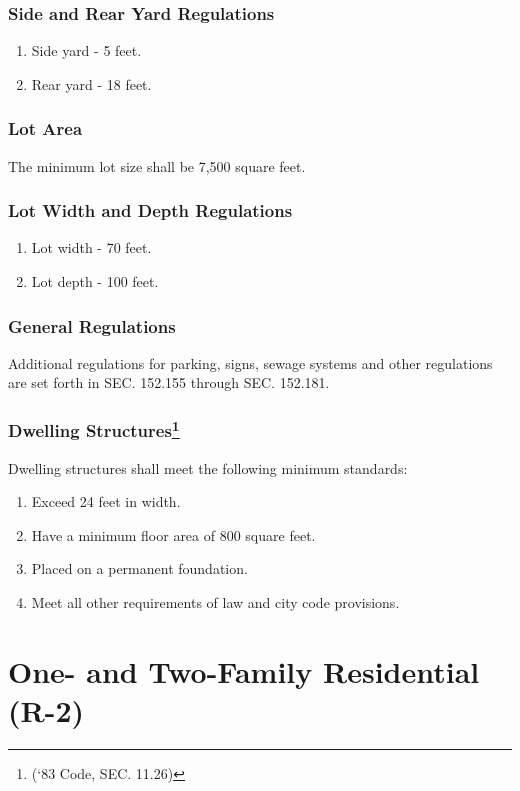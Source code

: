 \subsubsection{Side and Rear Yard Regulations}
\begin{enumerate}[{\indent}a)]
    \item Side yard - 5 feet.  
    \item Rear yard - 18 feet.
\end{enumerate}
\subsubsection{Lot Area}
The minimum lot size shall be 7,500 square feet.
\subsubsection{Lot Width and Depth Regulations}
\begin{enumerate}[{\indent}a)]
    \item Lot width - 70 feet.  
    \item Lot depth - 100 feet.
\end{enumerate}
\subsubsection{General Regulations}
Additional regulations for parking, signs, sewage systems and other regulations are set forth in SEC. 152.155 through SEC. 152.181.
\subsubsection{Dwelling Structures\footnote{(‘83 Code, SEC. 11.26)}}
Dwelling structures shall meet the following minimum standards:
\begin{enumerate}[{\indent}a)]
    \item Exceed 24 feet in width.
    \item Have a minimum floor area of 800 square feet.
    \item Placed on a permanent foundation.
    \item Meet all other requirements of law and city code provisions.
\end{enumerate}

\section{One- and Two-Family Residential (R-2)}
